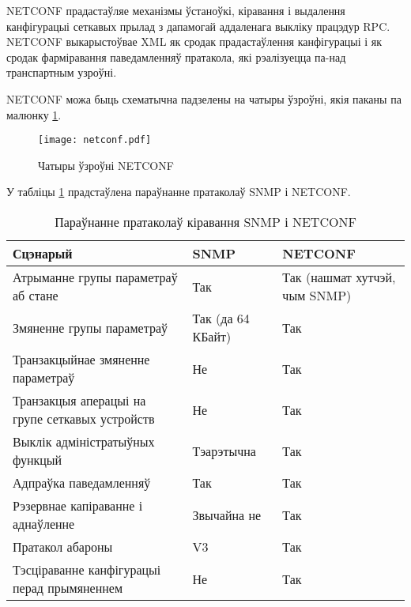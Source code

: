 NETCONF прадастаўляе механізмы ўстаноўкі, кіравання і выдалення канфігурацыі сеткавых прылад з дапамогай аддаленага выкліку працэдур RPC. NETCONF выкарыстоўвае XML як сродак прадастаўлення канфігурацыі і як сродак фарміравання паведамленняў пратакола, які рэалізуецца па-над транспартным узроўні.

NETCONF можа быць схематычна падзелены на чатыры ўзроўні, якія паканы па малюнку \ref{img: netconf}.

\vspace{-0.7\baselineskip}
\begin{figure}[ht!]
    \centering
    \texttt{[image: netconf.pdf]}
    \vspace{-0.7\baselineskip}
    \caption{Чатыры ўзроўні NETCONF}
    \label{img: netconf}
\end{figure}

У табліцы \ref{table: netconf} прадстаўлена параўнанне пратаколаў SNMP і NETCONF.


\begin{table}[htp]
    \caption{Параўнанне пратаколаў кіравання SNMP і NETCONF}
    \begin{tabularx}{\textwidth}{ 
        | >{\centering\arraybackslash}X 
        | >{\centering\arraybackslash}X 
        | >{\centering\arraybackslash}X |
    }
    \hline
    Сцэнарый & SNMP & NETCONF \\
    \hline
    Атрыманне групы параметраў аб стане & Так & Так (нашмат хутчэй, чым SNMP) \\
    \hline
    Змяненне групы параметраў &  Так (да 64 КБайт) & Так \\
    \hline
    Транзакцыйнае змяненне параметраў & Не & Так \\
    \hline
    Транзакцыя аперацыі на групе сеткавых устройств & Не & Так \\
    \hline
    Выклік адміністратыўных функцый & Тэарэтычна & Так \\
    \hline
    Адпраўка паведамленняў & Так & Так \\
    \hline
    Рэзервнае капіраванне і аднаўленне & Звычайна не & Так \\
    \hline
    Пратакол абароны & V3 & Так \\
    \hline
    Тэсціраванне канфігурацыі перад прымяненнем & Не & Так \\
    \hline
    \end{tabularx}
    \label{table: netconf}
\end{table}

